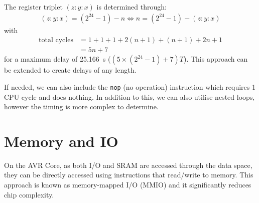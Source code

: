 \documentclass{report}
\begin{document}
The register triplet \(\left( z:y:x \right)\) is determined through:
\begin{align*}
    \left( z:y:x \right) = \left( 2^{24} - 1 \right) - n \iff n = \left( 2^{24} - 1 \right) - \left( z:y:x \right)
\end{align*}
with
\begin{align*}
    \text{total cycles} & = 1 + 1 + 1 + 2 \left( n + 1 \right) + \left( n + 1 \right) + 2 n + 1 \\
                        & = 5n + 7
\end{align*}
for a maximum delay of \qty{25.166}{s} (\(\left(5 \times \left( 2^{24} - 1 \right) + 7 \right) T\)).
This approach can be extended to create delays of any length.

If needed, we can also include the \texttt{nop} (no operation) instruction which requires 1 CPU cycle and does nothing.
In addition to this, we can also utilise nested loops, however the timing is more complex to determine.
\section{Memory and IO}
On the AVR Core, as both I/O and SRAM are accessed through the data space, they can be
directly accessed using instructions that read/write to memory. This approach is known as memory-mapped I/O (MMIO)
and it significantly reduces chip complexity.
\end{document}

